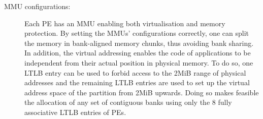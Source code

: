\documentclass[main.tex]{subfiles}
\begin{document}
\begin{description}
    \item[MMU configurations: ] Each PE has an MMU enabling both virtualisation
        and memory protection. By setting the MMUs' configurations correctly,
        one can split the memory in bank-aligned memory chunks, thus avoiding
        bank sharing. In addition, the virtual addressing enables the code of
        applications to be independent from their actual position in physical
        memory. To do so, one LTLB entry can be used to forbid access to the
        2MiB range of physical addresses and the remaining LTLB entries are
        used to set up the virtual address space of the partition from 2MiB
        upwards. Doing so makes feasible the allocation of any set of
        contiguous banks using only the 8 fully associative LTLB entries of
        PEs.
        

\end{description}
\end{document}
